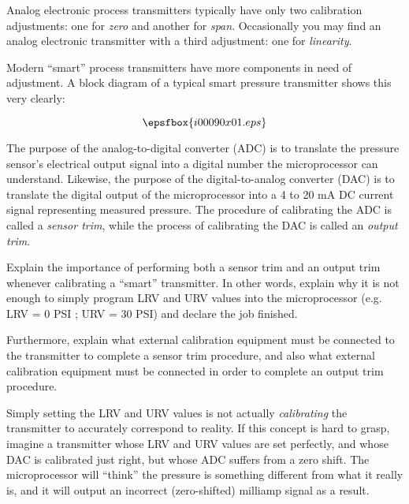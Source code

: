 

Analog electronic process transmitters typically have only two calibration adjustments: one for {\it zero} and another for {\it span}.  Occasionally you may find an analog electronic transmitter with a third adjustment: one for {\it linearity}.

Modern ``smart'' process transmitters have more components in need of adjustment.  A block diagram of a typical smart pressure transmitter shows this very clearly:

$$\epsfbox{i00090x01.eps}$$

The purpose of the analog-to-digital converter (ADC) is to translate the pressure sensor's electrical output signal into a digital number the microprocessor can understand.  Likewise, the purpose of the digital-to-analog converter (DAC) is to translate the digital output of the microprocessor into a 4 to 20 mA DC current signal representing measured pressure.  The procedure of calibrating the ADC is called a {\it sensor trim}, while the process of calibrating the DAC is called an {\it output trim}.

\vskip 10pt

Explain the importance of performing both a sensor trim and an output trim whenever calibrating a ``smart'' transmitter.  In other words, explain why it is not enough to simply program LRV and URV values into the microprocessor (e.g. LRV = 0 PSI ; URV = 30 PSI) and declare the job finished.

Furthermore, explain what external calibration equipment must be connected to the transmitter to complete a sensor trim procedure, and also what external calibration equipment must be connected in order to complete an output trim procedure.







Simply setting the LRV and URV values is not actually {\it calibrating} the transmitter to accurately correspond to reality.  If this concept is hard to grasp, imagine a transmitter whose LRV and URV values are set perfectly, and whose DAC is calibrated just right, but whose ADC suffers from a zero shift.  The microprocessor will ``think'' the pressure is something different from what it really is, and it will output an incorrect (zero-shifted) milliamp signal as a result.

